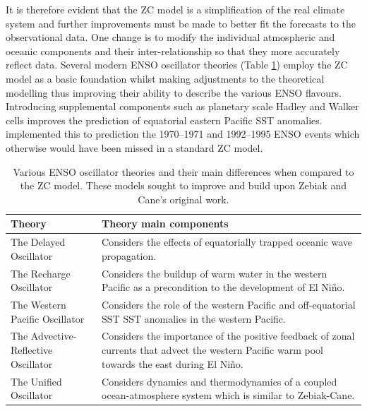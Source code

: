 \documentclass[12pt, onecolumn]{revtex4}    %
\begin{document}
It is therefore evident that the ZC model is a simplification of the real climate system and further improvements must be made to better fit the forecasts to the observational data. One change is to modify the individual atmospheric and oceanic components and their inter-relationship so that they more accurately reflect data. Several modern ENSO oscillator theories (Table \ref{table:enso_oscillators}) employ the ZC model as a basic foundation whilst making adjustments to the theoretical modelling thus improving their ability to describe the various ENSO flavours. Introducing supplemental components such as planetary scale Hadley and Walker cells improves the prediction of equatorial eastern Pacific SST anomalies. \cite{qian1997multiple} implemented this to prediction the 1970--1971 and 1992--1995 ENSO events which otherwise would have been missed in a standard ZC model. \\

\begin{table}[htbp]
\renewcommand{\arraystretch}{1.0}
\begin{tabular}{|p{7cm}|p{9cm}|}
 \hline
 \textbf{Theory} & \textbf{Theory main components} \\ [0.5ex] 
 \hline
 The Delayed Oscillator \citep{Suarez:1988aa, Battisti:1988aa} & Considers the effects of equatorially trapped oceanic wave propagation. \\
 \hline
 The Recharge Oscillator \citep{Jin:1997aa} & Considers the buildup of warm water in the western Pacific as a precondition to the development of El Ni\~{n}o. \\
 \hline
 The Western Pacific Oscillator \citep{Weisberg:1997aa, wang1999effects} & Considers the role of the western Pacific and off-equatorial SST SST anomalies in the western Pacific. \\
 \hline
 The Advective-Reflective Oscillator \citep{Picaut663} & Considers the importance of the positive feedback of zonal currents that advect the western Pacific warm pool towards the east during El Ni\~{n}o.  \\
 \hline
 The Unified Oscillator \citep{wang2001unified} & Considers dynamics and thermodynamics of a coupled ocean-atmosphere system which is similar to Zebiak-Cane. \\
 \hline
\end{tabular}
\caption[ENSO Oscillators]{Various ENSO oscillator theories and their main differences when compared to the ZC model. These models sought to improve and build upon Zebiak and Cane's original work.}
\label{table:enso_oscillators}
\end{table}
\end{document}
